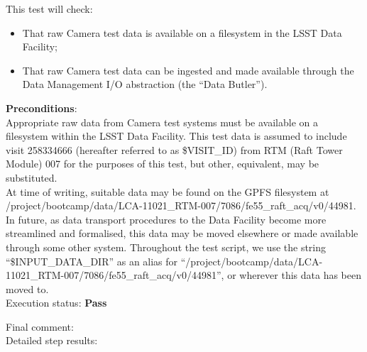 \documentclass[DM,STR,toc]{lsstdoc}
\providecommand{\tightlist}{
  \setlength{\itemsep}{0pt}\setlength{\parskip}{0pt}}
\begin{document}
    This test will check:

\begin{itemize}
\tightlist
\item
  That raw Camera test data is available on a filesystem in the LSST
  Data Facility;
\item
  That raw Camera test data can be ingested and made available through
  the Data Management I/O abstraction (the ``Data Butler'').
\end{itemize}


    {\bf Preconditions}:\\
    Appropriate raw data from Camera test systems must be available on a
filesystem within the LSST Data Facility. This test data is assumed to
include visit 258334666 (hereafter referred to as \$VISIT\_ID) from RTM
(Raft Tower Module) 007 for the purposes of this test, but other,
equivalent, may be substituted.\\[2\baselineskip]At time of writing,
suitable data may be found on the GPFS filesystem at
/project/bootcamp/data/LCA-11021\_RTM-007/7086/fe55\_raft\_acq/v0/44981.
In future, as data transport procedures to the Data Facility become more
streamlined and formalised, this data may be moved elsewhere or made
available through some other system. Throughout the test script, we use
the string ``\$INPUT\_DATA\_DIR'' as an alias for
``/project/bootcamp/data/LCA-11021\_RTM-007/7086/fe55\_raft\_acq/v0/44981'',
or wherever this data has been moved to.\\[2\baselineskip]


    Execution status: {\bf Pass }

    Final comment:\\


    Detailed step results:
\end{document}
